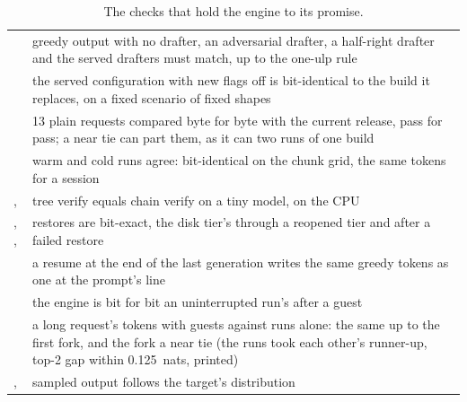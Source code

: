 \begin{table}[H]
\centering\small
\caption{The checks that hold the engine to its promise.}\label{tab:exactness-checks}
\begin{tabularx}{\linewidth}{@{}L{.38\linewidth}Y@{}}
\toprule
{} &  \\
\midrule
{} & greedy output with no drafter, an adversarial drafter, a half-right drafter and the served drafters must match, up to the one-ulp rule \\
 & the served configuration with new flags off is bit-identical to the build it replaces, on a fixed scenario of fixed shapes \\
 & 13 plain requests compared byte for byte with the current release, pass for pass; a near tie can part them, as it can two runs of one build \\
 & warm and cold runs agree: bit-identical on the chunk grid, the same tokens for a session \\
,  & tree verify equals chain verify on a tiny model, on the CPU \\
, ,  & restores are bit-exact, the disk tier's through a reopened tier and after a failed restore \\
 & a resume at the end of the last generation writes the same greedy tokens as one at the prompt's line \\
 & the engine is bit for bit an uninterrupted run's after a guest \\
 & a long request's tokens with guests against runs alone: the same up to the first fork, and the fork a near tie (the runs took each other's runner-up, top-2 gap within 0.125~nats, printed) \\
,  & sampled output follows the target's distribution \\
\bottomrule
\end{tabularx}
\end{table}
